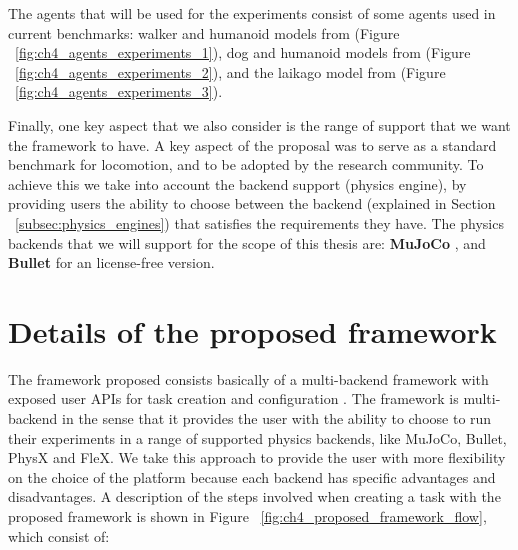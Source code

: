 The agents that will be used for the experiments consist of some agents used in current
benchmarks: walker and humanoid models from \cite{Controlsuite} (Figure ~\ref{fig:ch4_agents_experiments_1}), 
dog and humanoid models from \cite{TerrainRLSim} (Figure ~\ref{fig:ch4_agents_experiments_2}), 
and the laikago model from \cite{PyBullet} (Figure ~\ref{fig:ch4_agents_experiments_3}).

\figAgentsExperimentsOne

\figAgentsExperimentsTwo

\figAgentsExperimentsThree

Finally, one key aspect that we also consider is the range of support that we want the
framework to have. A key aspect of the proposal was to serve as a standard benchmark
for locomotion, and to be adopted by the research community. To achieve this we take
into account the backend support (physics engine), by providing users the ability
to choose between the backend (explained in Section ~\ref{subsec:physics_engines}) 
that satisfies the requirements they have. The physics backends that we will support
for the scope of this thesis are: \textbf{MuJoCo} \citep{MuJoCo}, and \textbf{Bullet} 
\citep{Bullet} for an license-free version.

\section{Details of the proposed framework}

The framework proposed consists basically of a multi-backend framework with exposed user APIs 
for task creation and configuration . The framework is multi-backend
in the sense that it provides the user with the ability to choose to run their experiments
in a range of supported physics backends, like MuJoCo, Bullet, PhysX and FleX. We take
this approach to provide the user with more flexibility on the choice of the platform because
each backend has specific advantages and disadvantages. A description of the steps involved 
when creating a task with the proposed framework is shown in Figure ~\ref{fig:ch4_proposed_framework_flow}, 
which consist of:

